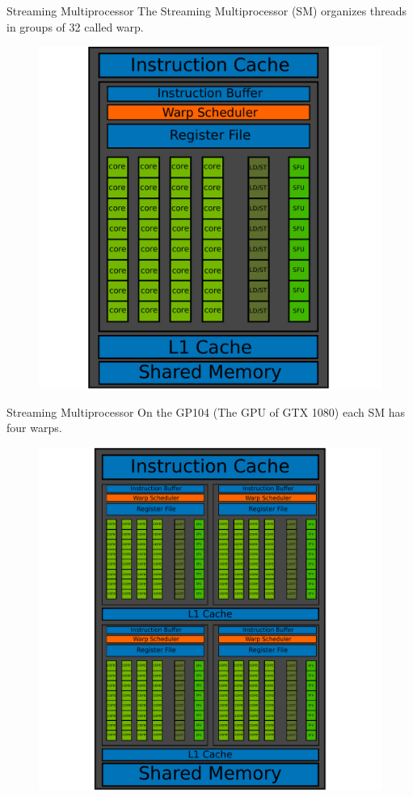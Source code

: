 \documentclass{beamer}
\begin{document}
\begin{frame}{Streaming Multiprocessor}
	The Streaming Multiprocessor (SM) organizes threads in groups of 32 called warp.
	\begin{figure}
		\includegraphics[scale=0.3]{figures/warp.pdf}
	\end{figure}
\end{frame}

\begin{frame}{Streaming Multiprocessor}
	On the GP104 (The GPU of GTX 1080) each SM has four warps. 
	\begin{figure}
		\includegraphics[scale=0.3]{figures/SM.pdf}
	\end{figure}
\end{frame}
\end{document}
